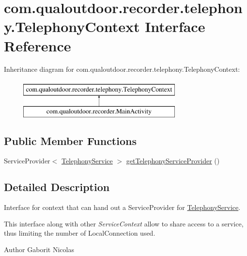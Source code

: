 \hypertarget{interfacecom_1_1qualoutdoor_1_1recorder_1_1telephony_1_1TelephonyContext}{\section{com.\-qualoutdoor.\-recorder.\-telephony.\-Telephony\-Context Interface Reference}
\label{interfacecom_1_1qualoutdoor_1_1recorder_1_1telephony_1_1TelephonyContext}
}
Inheritance diagram for com.\-qualoutdoor.\-recorder.\-telephony.\-Telephony\-Context\-:\begin{figure}[H]
\begin{center}
\leavevmode
\includegraphics[height=2.000000cm]{interfacecom_1_1qualoutdoor_1_1recorder_1_1telephony_1_1TelephonyContext}
\end{center}
\end{figure}
\subsection*{Public Member Functions}
\begin{DoxyCompactItemize}
\item 
Service\-Provider$<$ \hyperlink{classcom_1_1qualoutdoor_1_1recorder_1_1telephony_1_1TelephonyService}{Telephony\-Service} $>$ \hyperlink{interfacecom_1_1qualoutdoor_1_1recorder_1_1telephony_1_1TelephonyContext_af4f029989992c648956657f2d8a6895f}{get\-Telephony\-Service\-Provider} ()
\end{DoxyCompactItemize}


\subsection{Detailed Description}
Interface for context that can hand out a Service\-Provider for \hyperlink{classcom_1_1qualoutdoor_1_1recorder_1_1telephony_1_1TelephonyService}{Telephony\-Service}.

This interface along with other {\itshape Service\-Context} allow to share access to a service, thus limiting the number of Local\-Connection used.

\begin{DoxyAuthor}{Author}
Gaborit Nicolas 
\end{DoxyAuthor}


